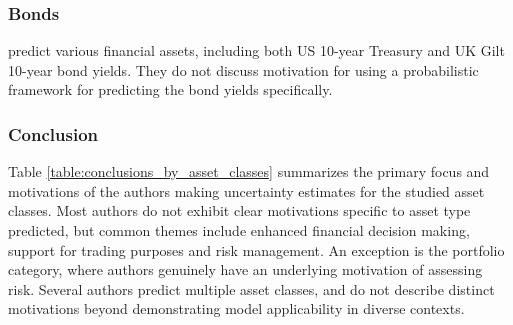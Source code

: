 \subsubsection{Bonds}
\textcite{Law2017Practical} predict various financial assets, including both US 10-year Treasury and UK Gilt 10-year bond yields. They do not discuss motivation for using a probabilistic framework for predicting the bond yields specifically. 






\subsubsection{Conclusion} %

Table \ref{table:conclusions_by_asset_classes} summarizes the primary focus and motivations of the authors making uncertainty estimates for the studied asset classes. Most authors do not exhibit clear motivations specific to asset type predicted, but common themes include enhanced financial decision making, support for trading purposes and risk management. An exception is the portfolio category, where authors genuinely have an underlying motivation of assessing risk. Several authors predict multiple asset classes, and do not describe distinct motivations beyond demonstrating model applicability in diverse contexts. 

